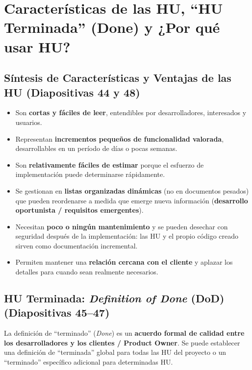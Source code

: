 \section{Características de las HU, ``HU Terminada'' (Done) y ¿Por qué usar HU?}

\subsection{Síntesis de Características y Ventajas de las HU (Diapositivas 44 y 48)}
\begin{itemize}[itemsep=3pt]
    \item Son \textbf{cortas y fáciles de leer}, entendibles por desarrolladores, interesados y usuarios.
    \item Representan \textbf{incrementos pequeños de funcionalidad valorada}, desarrollables en un período de días o pocas semanas.
    \item Son \textbf{relativamente fáciles de estimar} porque el esfuerzo de implementación puede determinarse rápidamente.
    \item Se gestionan en \textbf{listas organizadas dinámicas} (no en documentos pesados) que pueden reordenarse a medida que emerge nueva información (\textbf{desarrollo oportunista / requisitos emergentes}).
    \item Necesitan \textbf{poco o ningún mantenimiento} y se pueden desechar con seguridad después de la implementación: las HU y el propio código creado sirven como documentación incremental.
    \item Permiten mantener una \textbf{relación cercana con el cliente} y aplazar los detalles para cuando sean realmente necesarios.
\end{itemize}

\subsection{HU Terminada: \textit{Definition of Done} (DoD) (Diapositivas 45--47)}

\begin{definicion}
La definición de ``terminado'' (\textit{Done}) es un \textbf{acuerdo formal de calidad entre los desarrolladores y los clientes / Product Owner}. Se puede establecer una definición de ``terminada'' global para todas las HU del proyecto o un ``terminado'' específico adicional para determinadas HU.
\end{definicion}

